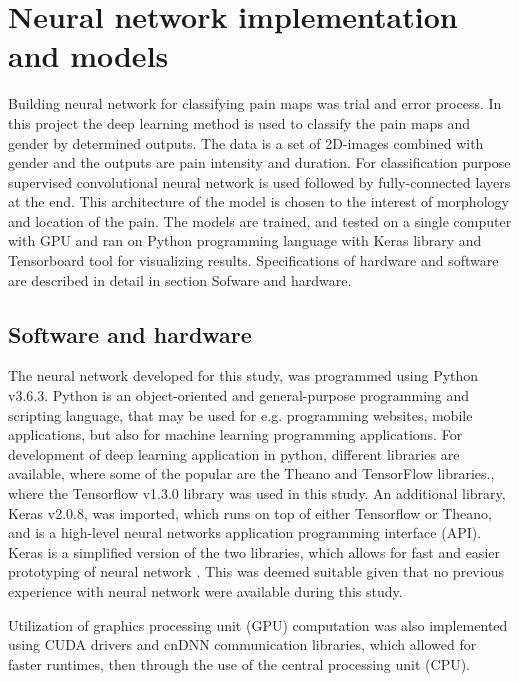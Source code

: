 \section{Neural network implementation and models}
Building neural network for classifying pain maps was trial and error process.
In this project the deep learning method is used to classify the pain maps and gender by determined outputs. The data is a set of 2D-images combined with gender and the outputs are pain intensity and duration. For classification purpose supervised convolutional neural network is used followed by fully-connected layers at the end. This architecture of the model is chosen to the interest of morphology and location of the pain. The models are trained, and tested on a single computer with GPU and ran on Python programming language with Keras library and Tensorboard tool for visualizing results. Specifications of hardware and software are described in detail in section {Sofware and hardware}.

\subsection{Software and hardware}
The neural network developed for this study, was programmed using Python v3.6.3. Python is an object-oriented and general-purpose programming and scripting language, that may be used for e.g. programming websites, mobile applications, but also for machine learning programming applications.
For development of deep learning application in python, different libraries are available, where some of the popular are the Theano and TensorFlow libraries.\citep{Swamynathan2017}, where the Tensorflow v1.3.0 library was used in this study. %
An additional library, Keras v2.0.8, was imported, which runs on top of either Tensorflow or Theano, and is a high-level neural networks application programming interface (API).   
Keras is a simplified version of the two libraries, which allows for fast and easier prototyping of neural network \citep{fcollet2015}. This was deemed suitable given that no previous experience with neural network were available during this study.  

Utilization of graphics processing unit (GPU) computation was also implemented using CUDA drivers and cnDNN communication libraries, which allowed for faster runtimes, then through the use of the central processing unit (CPU).
 
